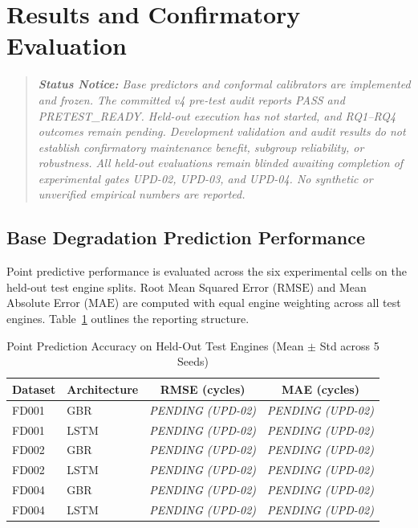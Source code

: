 \section{Results and Confirmatory Evaluation}
\label{sec:results}

\begin{quote}
\itshape
\textbf{Status Notice:} Base predictors and conformal calibrators are implemented and frozen. The committed v4 pre-test audit reports PASS and PRETEST\_READY. Held-out execution has not started, and RQ1--RQ4 outcomes remain pending. Development validation and audit results do not establish confirmatory maintenance benefit, subgroup reliability, or robustness. All held-out evaluations remain blinded awaiting completion of experimental gates \emph{UPD-02}, \emph{UPD-03}, and \emph{UPD-04}. No synthetic or unverified empirical numbers are reported.
\end{quote}

\subsection{Base Degradation Prediction Performance}
\label{subsec:point_results}
Point predictive performance is evaluated across the six experimental cells on the held-out test engine splits. Root Mean Squared Error ($\text{RMSE}$) and Mean Absolute Error ($\text{MAE}$) are computed with equal engine weighting across all test engines. Table~\ref{tab:point_prediction_results} outlines the reporting structure.

\begin{table}[htbp]
\centering
\caption{Point Prediction Accuracy on Held-Out Test Engines (Mean $\pm$ Std across 5 Seeds)}
\label{tab:point_prediction_results}
\begin{tabular}{llcc}
\toprule
\textbf{Dataset} & \textbf{Architecture} & \textbf{RMSE (cycles)} & \textbf{MAE (cycles)} \\
\midrule
FD001 & GBR  & \textit{PENDING (UPD-02)} & \textit{PENDING (UPD-02)} \\
FD001 & LSTM & \textit{PENDING (UPD-02)} & \textit{PENDING (UPD-02)} \\
\midrule
FD002 & GBR  & \textit{PENDING (UPD-02)} & \textit{PENDING (UPD-02)} \\
FD002 & LSTM & \textit{PENDING (UPD-02)} & \textit{PENDING (UPD-02)} \\
\midrule
FD004 & GBR  & \textit{PENDING (UPD-02)} & \textit{PENDING (UPD-02)} \\
FD004 & LSTM & \textit{PENDING (UPD-02)} & \textit{PENDING (UPD-02)} \\
\bottomrule
\end{tabular}
\end{table}

